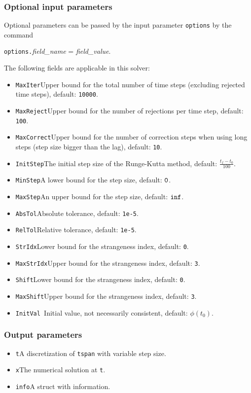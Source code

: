 \documentclass[final,reqno]{siamltex}
\begin{document}
\subsubsection{Optional input parameters}
Optional parameters can be passed by the input parameter {\tt options} by the command 
\begin{center}
{\tt options.}{\it field\_name} = {\it field\_value}.
\end{center}
The following fields are applicable in this solver:
\begin{itemize}
\item {\tt MaxIter}\quad        Upper bound for the total number of time steps (excluding 
	rejected time steps), default: {\tt 10000}.
\item {\tt MaxReject}\quad      Upper bound for the number of rejections per time step, default: {\tt 100}.
\item{\tt MaxCorrect}\quad  Upper bound for the number of correction steps when using
         long steps (step size bigger than the lag), default: {\tt10}.
\item {\tt InitStep}\quad        The initial step size of the Runge-Kutta method, default: $\frac{t_f-t_0}{100}$.
\item {\tt MinStep}\quad         A lower bound for the step size, default: $\tt 0$.
\item {\tt MaxStep}\quad      An upper bound for the step size, default: $\tt inf$.
\item {\tt AbsTol}\quad       Absolute tolerance, default:  {\tt 1e-5}.
\item {\tt RelTol}\quad       Relative tolerance, default:  {\tt 1e-5}.
\item {\tt StrIdx}\quad       Lower bound for the strangeness index,  default: {\tt 0}.
\item {\tt MaxStrIdx}\quad    Upper bound for the strangeness index,  default: {\tt 3}.
\item {\tt Shift}\quad       Lower bound for the strangeness index,  default: {\tt 0}.
\item {\tt MaxShift}\quad    Upper bound for the strangeness index,  default: {\tt 3}.
\item {\tt InitVal  }\quad    Initial value, not necessarily consistent,  default: $\phi(t_0)$.
\end{itemize}

\subsubsection{Output parameters}
\begin{itemize}
\item {\tt t}\quad A discretization of {\tt tspan} with variable step size.
\item {\tt x}\quad The numerical solution at {\tt t}.
\item {\tt info}\quad A struct with information.
\end{itemize}
\end{document}
